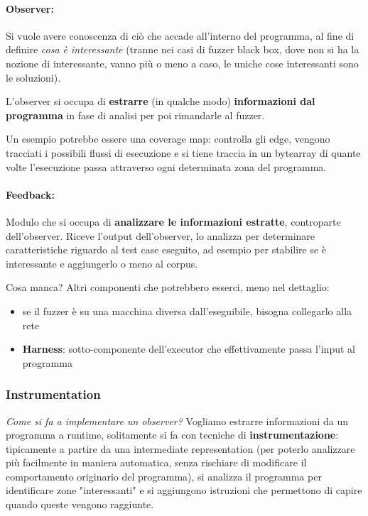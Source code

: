 \paragraph{Observer:} Si vuole avere conoscenza di ciò che accade all'interno del programma, al fine di definire \textit{cosa è interessante} (tranne nei casi di fuzzer black box, dove non si ha la nozione di interessante, vanno più o meno a caso, le uniche cose interessanti sono le soluzioni). 

L'observer si occupa di \textbf{estrarre} (in qualche modo) \textbf{informazioni dal programma} in fase di analisi per poi rimandarle al fuzzer. 

Un esempio potrebbe essere una coverage map: controlla gli edge, vengono tracciati i possibili flussi di esecuzione e si tiene traccia in un bytearray di quante volte l'esecuzione passa attraverso ogni determinata zona del programma.

\paragraph{Feedback:} Modulo che si occupa di \textbf{analizzare le informazioni estratte}, controparte dell'observer. Riceve l'output dell'observer, lo analizza per determinare caratteristiche riguardo al test case eseguito, ad esempio per stabilire se è interessante e aggiungerlo o meno al corpus.

Cosa manca? Altri componenti che potrebbero esserci, meno nel dettaglio: 
\begin{itemize}
    \item se il fuzzer è su una macchina diversa dall'eseguibile, bisogna collegarlo alla rete
    \item \textbf{Harness}: sotto-componente dell'executor che effettivamente passa l'input al programma
\end{itemize}

\subsubsection{Instrumentation}

\textit{Come si fa a implementare un observer?} Vogliamo estrarre informazioni da un programma a runtime, solitamente si fa con tecniche di \textbf{instrumentazione}: tipicamente a partire da una intermediate representation (per poterlo analizzare più facilmente in maniera automatica, senza rischiare di modificare il comportamento originario del programma), si analizza il programma per identificare zone "interessanti" e si aggiungono istruzioni che permettono di capire quando queste vengono raggiunte. 

